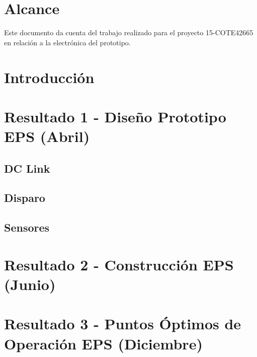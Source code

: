 \documentclass[12pt,twoside,onecolumn]{article}
\begin{document}
 
 
\newpage 
\section{Alcance}
Este documento da cuenta del trabajo realizado para el proyecto 15-COTE42665 en relación a la electrónica del prototipo.

\section{Introducción}

\section{Resultado 1 - Diseño Prototipo EPS (Abril)} %

\subsection{DC Link}

\subsection{Disparo}

\subsection{Sensores}


\section{Resultado 2 - Construcción EPS (Junio)} %

\section{Resultado 3 - Puntos Óptimos de Operación EPS (Diciembre)} %

\newpage


{}
\end{document}
